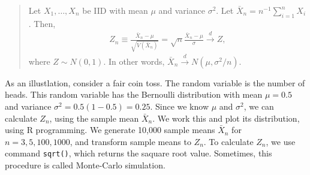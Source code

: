 \documentclass[
  12pt,
]{article}
\begin{document}
\begin{quote}
Let \(X_1, \ldots, X_n\) be IID with mean \(\mu\) and variance \(\sigma^2\).
Let \(\bar{X}_n = n^{-1} \sum_{i=1}^n X_i\). Then,
\begin{align*}
Z_n \equiv \frac{\bar{X}_n - \mu}{\sqrt{V(\bar{X}_n)}} = \sqrt{n}\frac{\bar{X}_n - \mu}{\sigma} \stackrel{d}{\to} Z,
\end{align*}
where \(Z \sim N(0, 1)\). In other words, \(\bar{X}_n \stackrel{d}{\to} N(\mu, \sigma^2/n)\).
\end{quote}

As an illustlation, consider a fair coin toss.
The random variable is the number of heads.
This random variable has the Bernoulli distribution with mean \(\mu = 0.5\) and variance \(\sigma^2 = 0.5(1 - 0.5) = 0.25\).
Since we know \(\mu\) and \(\sigma^2\), we can calculate \(Z_n\), using the sample mean \(\bar{X}_n\).
We work this and plot its distribution, using R programming.
We generate 10,000 sample means \(\bar{X}_n\) for \(n = 3, 5, 100, 1000\), and transform sample means to \(Z_n\).
To calculate \(Z_n\), we use command \texttt{sqrt()}, which returns the saquare root value.
Sometimes, this procedure is called Monte-Carlo simulation.
\end{document}

